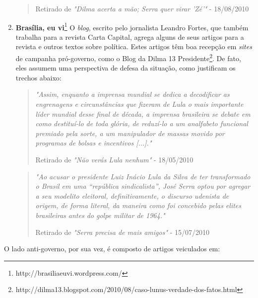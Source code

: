 \begin{enumerate}
\begin{quote}
{\small Retirado de \emph{"Dilma acerta a mão; Serra quer virar 'Zé'"} - 18/08/2010}

\end{quote}

\item \textbf{Brasília, eu vi}\footnote{http://brasiliaeuvi.wordpress.com/} O \emph{blog}, escrito pelo jornalista Leandro Fortes, que também trabalha para a revista Carta Capital, agrega alguns de seus artigos para a revista e outros textos sobre política. Estes artigos têm boa recepção em \emph{sites} de campanha pró-governo, como o Blog da Dilma 13 Presidente\footnote{http://dilma13.blogspot.com/2010/08/caso-lunus-verdade-dos-fatos.html}. De fato, eles assumem uma perspectiva de defesa da situação, como justificam os trechos abaixo:


\begin{quote}
\emph{"Assim, enquanto a imprensa mundial se dedica a decodificar as engrenagens e circunstâncias que fizeram de Lula o mais importante líder mundial desse final de década, a imprensa brasileira se debate em como destituí-lo de toda glória, de reduzí-lo a um analfabeto funcional premiado pela sorte, a um manipulador de massas movido por programas de bolsas e incentivos [...]."}

{\small Retirado de \emph{"Não verás Lula nenhum"} - 18/05/2010}
\end{quote}

\begin{quote}

\emph{"Ao acusar o presidente Luiz Inácio Lula da Silva de ter transformado o Brasil em uma “república sindicalista”, José Serra optou por agregar a seu modelito eleitoral, definitivamente, o discurso udenista de origem, de forma literal, da maneira como foi concebido pelas elites brasileiras antes do golpe militar de 1964."}

{\small Retirado de \emph{"Serra precisa de mais amigos"} - 15/07/2010}
\end{quote}
\end{enumerate}


O lado anti-governo, por sua vez, é composto de artigos veiculados em:

